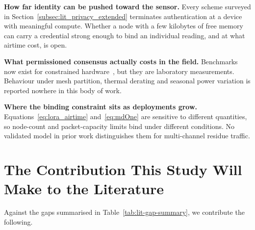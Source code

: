 \textbf{How far identity can be pushed toward the sensor.} Every scheme
surveyed in Section~\ref{subsec:lit_privacy_extended} terminates authentication
at a device with meaningful compute. Whether a node with a few kilobytes of
free memory can carry a credential strong enough to bind an individual reading,
and at what airtime cost, is open.

\textbf{What permissioned consensus actually costs in the
field.} Benchmarks now exist for constrained
hardware~\cite{zulkarnain2025performancebenchmarking, pebriyanti2025evaluationscalability}, but they are laboratory measurements.
Behaviour under mesh partition, thermal derating and seasonal power variation
is reported nowhere in this body of work.

\textbf{Where the binding constraint sits as deployments grow.}
Equations~\ref{eq:lora_airtime} and~\ref{eq:mdOne} are sensitive to
different quantities, so node-count and packet-capacity limits bind under
different conditions. No validated model in prior work distinguishes
them for multi-channel residue traffic.

\section{The Contribution This Study Will Make to the Literature}
\label{sec:lit_contribution}

Against the gaps summarised in Table~\ref{tab:lit-gap-summary}, we
contribute the following.

